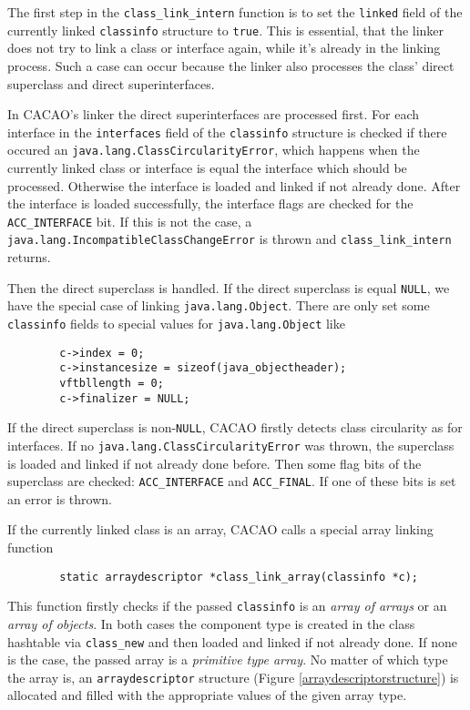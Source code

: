 The first step in the \texttt{class\_link\_intern} function is to set
the \texttt{linked} field of the currently linked \texttt{classinfo}
structure to \texttt{true}. This is essential, that the linker does
not try to link a class or interface again, while it's already in the
linking process. Such a case can occur because the linker also
processes the class' direct superclass and direct superinterfaces.

In CACAO's linker the direct superinterfaces are processed first. For
each interface in the \texttt{interfaces} field of the
\texttt{classinfo} structure is checked if there occured an
\texttt{java.lang.ClassCircularityError}, which happens when the
currently linked class or interface is equal the interface which
should be processed. Otherwise the interface is loaded and linked if
not already done. After the interface is loaded successfully, the
interface flags are checked for the \texttt{ACC\_INTERFACE} bit. If
this is not the case, a
\texttt{java.lang.IncompatibleClassChangeError} is thrown and
\texttt{class\_link\_intern} returns.

Then the direct superclass is handled. If the direct superclass is
equal \texttt{NULL}, we have the special case of linking
\texttt{java.lang.Object}. There are only set some \texttt{classinfo}
fields to special values for \texttt{java.lang.Object} like

\begin{verbatim}
        c->index = 0;
        c->instancesize = sizeof(java_objectheader);
        vftbllength = 0;
        c->finalizer = NULL;
\end{verbatim}

If the direct superclass is non-\texttt{NULL}, CACAO firstly detects
class circularity as for interfaces. If no
\texttt{java.lang.ClassCircularityError} was thrown, the superclass is
loaded and linked if not already done before. Then some flag bits of
the superclass are checked: \texttt{ACC\_INTERFACE} and
\texttt{ACC\_FINAL}. If one of these bits is set an error is thrown.

If the currently linked class is an array, CACAO calls a special array
linking function

\begin{verbatim}
        static arraydescriptor *class_link_array(classinfo *c);
\end{verbatim}

This function firstly checks if the passed \texttt{classinfo} is an
\textit{array of arrays} or an \textit{array of objects}. In both
cases the component type is created in the class hashtable via
\texttt{class\_new} and then loaded and linked if not already
done. If none is the case, the passed array is a \textit{primitive
type array}. No matter of which type the array is, an
\texttt{arraydescriptor} structure (Figure
\ref{arraydescriptorstructure}) is allocated and filled with the
appropriate values of the given array type.

